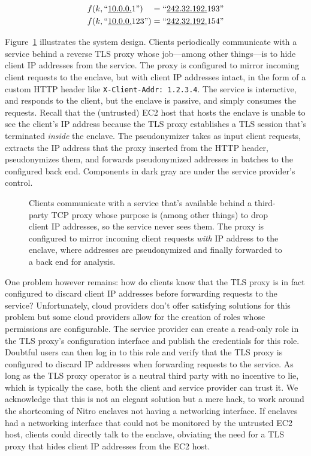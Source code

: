 \begin{align}
f(k, \textrm{``\underline{10.0.0.}1''})\phantom{23} = \textrm{``\underline{242.32.192.}193''} \\
f(k, \textrm{``\underline{10.0.0.}123''}) = \textrm{``\underline{242.32.192.}154''}
\end{align}

Figure~\ref{fig:address-anonymizer} illustrates the system design.  Clients
periodically communicate with a service behind a reverse TLS proxy whose
job---among other things---is to hide client IP addresses from the service.  The
proxy is configured to mirror incoming client requests to the enclave, but with
client IP addresses intact, in the form of a custom HTTP header like
\texttt{X-Client-Addr: 1.2.3.4}.  The service is interactive, and responds to
the client, but the enclave is passive, and simply consumes the requests.
Recall that the (untrusted) EC2 host that hosts the enclave is unable to see
the client's IP address because the TLS proxy establishes a TLS session that's
terminated \emph{inside} the enclave.  The pseudonymizer takes as input client
requests, extracts the IP address that the proxy inserted from the HTTP header,
pseudonymizes them, and forwards pseudonymized addresses in batches to the
configured back end.  Components in dark gray are under the service provider's
control.

\begin{figure}[t]
\centering

\caption{Clients communicate with a service that's available behind a
  third-party TCP proxy whose purpose is (among other things) to drop client IP
  addresses, so the service never sees them.  The proxy is configured to mirror
  incoming client requests \emph{with} IP address to the enclave, where
  addresses are pseudonymized and finally forwarded to a back end for analysis.}
\label{fig:address-anonymizer}
\end{figure}

One problem however remains: how do clients know that the TLS proxy is in fact
configured to discard client IP addresses before forwarding requests to the
service?  Unfortunately, cloud providers don't offer satisfying solutions for
this problem but some cloud providers allow for the creation of roles whose
permissions are configurable.  The service provider can create a read-only role
in the TLS proxy's configuration interface and publish the credentials for this
role.  Doubtful users can then log in to this role and verify that the TLS proxy
is configured to discard IP addresses when forwarding requests to the service.
As long as the TLS proxy operator is a neutral third party with no incentive to
lie, which is typically the case, both the client and service provider can trust
it.  We acknowledge that this is not an elegant solution but a mere hack, to
work around the shortcoming of Nitro enclaves not having a networking interface.
If enclaves had a networking interface that could not be monitored by the
untrusted EC2 host, clients could directly talk to the enclave, obviating the
need for a TLS proxy that hides client IP addresses from the EC2 host.

